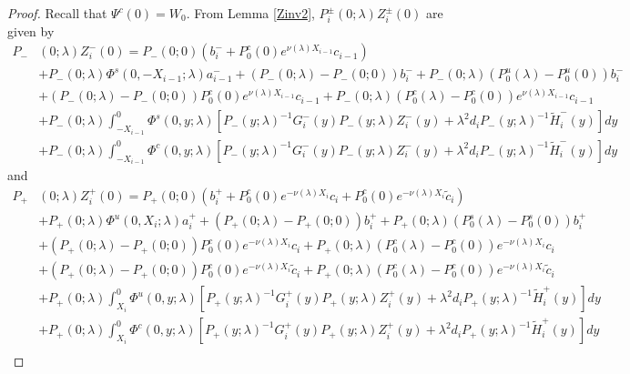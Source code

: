 \documentclass[thesis.tex]{subfiles}
\begin{document}
\begin{lemma}
\begin{proof}
Recall that $\Psi^c(0) = W_0$. From Lemma \ref{Zinv2}, $P_i^\pm(0; \lambda) Z_i^\pm(0)$ are given by
\begin{align*}
P_-&(0; \lambda) Z_i^-(0) = P_-(0; 0)( b_i^- + P_0^c(0) e^{\nu(\lambda) X_{i-1}} c_{i-1} ) \\
&+ P_-(0; \lambda) \Phi^s(0, -X_{i-1}; \lambda) a_{i-1}^- + (P_-(0; \lambda) - P_-(0; 0))b_i^- + P_-(0; \lambda)(P_0^u(\lambda) - P_0^u(0))b_i^- \\
&+ (P_-(0; \lambda) - P_-(0; 0)) P_0^c(0) e^{\nu(\lambda) X_{i-1}} c_{i-1} + P_-(0; \lambda) (P_0^c(\lambda) - P_0^c(0)) e^{\nu(\lambda) X_{i-1}} c_{i-1} \\
&+ P_-(0; \lambda) \int_{-X_{i-1}}^0 \Phi^s(0, y; \lambda) [P_-(y; \lambda)^{-1} G_i^-(y) P_-(y; \lambda)Z_i^-(y) + \lambda^2 d_i P_-(y; \lambda)^{-1} \tilde{H}_i^-(y)] dy \\
&+ P_-(0; \lambda) \int_{-X_{i-1}}^0 \Phi^c(0, y; \lambda) [P_-(y; \lambda)^{-1} G_i^-(y) P_-(y; \lambda)Z_i^-(y) + \lambda^2 d_i P_-(y; \lambda)^{-1} \tilde{H}_i^-(y)] dy
\end{align*}
and
\begin{align*}
P_+&(0; \lambda) Z_i^+(0) = P_+(0; 0)( b_i^+ + P_0^c(0) e^{-\nu(\lambda)X_i} c_i + P_0^c(0) e^{-\nu(\lambda)X_i} \tilde{c}_i )\\
&+ P_+(0; \lambda) \Phi^u(0, X_i; \lambda) a_i^+ + (P_+(0; \lambda) - P_+(0; 0)) b_i^+ + P_+(0; \lambda) (P_0^s(\lambda) - P_0^s(0)) b_i^+ \\
&+ (P_+(0; \lambda) - P_+(0; 0))P_0^c(0) e^{-\nu(\lambda)X_i} c_i + P_+(0; \lambda) (P_0^c(\lambda) - P_0^c(0)) e^{-\nu(\lambda)X_i} c_i \\
&+ (P_+(0; \lambda) - P_+(0; 0))P_0^c(0) e^{-\nu(\lambda)X_i} \tilde{c}_i + P_+(0; \lambda) (P_0^c(\lambda) - P_0^c(0)) e^{-\nu(\lambda)X_i} \tilde{c}_i \\
&+ P_+(0; \lambda) \int_{X_i}^0 \Phi^u(0, y; \lambda) [P_+(y; \lambda)^{-1} G_i^+(y) P_+(y; \lambda) Z_i^+(y) + \lambda^2 d_i P_+(y; \lambda)^{-1} \tilde{H}_i^+(y)] dy \\
&+ P_+(0; \lambda) \int_{X_i}^0 \Phi^c(0, y; \lambda) [P_+(y; \lambda)^{-1} G_i^+(y) P_+(y; \lambda) Z_i^+(y) + \lambda^2 d_i P_+(y; \lambda)^{-1} \tilde{H}_i^+(y)] dy \\
\end{align*}


\end{proof}
\end{lemma}
\end{document}
